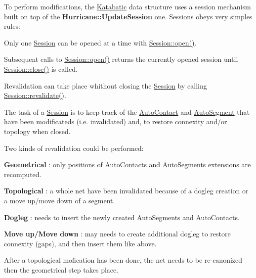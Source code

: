 To perform modifications, the \mbox{\hyperlink{namespaceKatabatic}{Katabatic}} data structure uses a session mechanism built on top of the \textbf{ Hurricane\+::\+Update\+Session} one. Sessions obeys very simples rules\+:
\begin{DoxyItemize}
\item Only one \mbox{\hyperlink{classKatabatic_1_1Session}{Session}} can be opened at a time with \mbox{\hyperlink{classKatabatic_1_1Session_a000e098850f6cccff6b289a294149a41}{Session\+::open()}}.
\item Subsequent calls to \mbox{\hyperlink{classKatabatic_1_1Session_a000e098850f6cccff6b289a294149a41}{Session\+::open()}} returns the currently opened session until \mbox{\hyperlink{classKatabatic_1_1Session_a5ae591df94fc66ccb85cbb6565368bca}{Session\+::close()}} is called.
\item Revalidation can take place whithout closing the \mbox{\hyperlink{classKatabatic_1_1Session}{Session}} by calling \mbox{\hyperlink{classKatabatic_1_1Session_a4da9e28432c1fdb0c754717487d9cc83}{Session\+::revalidate()}}.
\end{DoxyItemize}

The task of a \mbox{\hyperlink{classKatabatic_1_1Session}{Session}} is to keep track of the \mbox{\hyperlink{classKatabatic_1_1AutoContact}{Auto\+Contact}} and \mbox{\hyperlink{classKatabatic_1_1AutoSegment}{Auto\+Segment}} that have been modificateds (i.\+e. invalidated) and, to restore connexity and/or topology when closed.

Two kinds of revalidation could be performed\+: 
\begin{DoxyItemize}
\item {\bfseries Geometrical} \+: only positions of Auto\+Contacts and Auto\+Segments extensions are recomputed. 
\item {\bfseries Topological} \+: a whole net have been invalidated because of a dogleg creation or a move up/move down of a segment. 
\begin{DoxyItemize}
\item {\bfseries Dogleg} \+: needs to insert the newly created Auto\+Segments and Auto\+Contacts. 
\item {\bfseries Move up/\+Move down} \+: may needs to create additional dogleg to restore connexity (gaps), and then insert them like above. 
\end{DoxyItemize}After a topological mofication has been done, the net needs to be re-\/canonized then the geometrical step takes place. 
\end{DoxyItemize}


